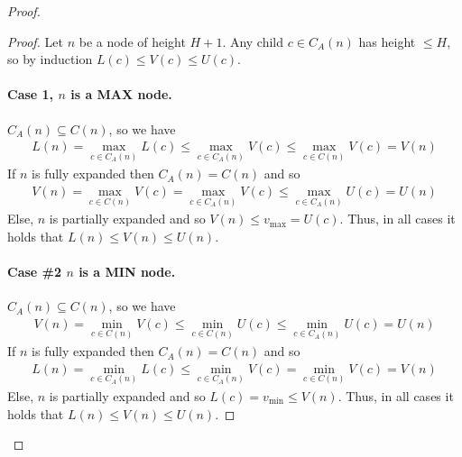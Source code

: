 \documentclass[letterpaper]{article} %
\newcommand{\MM}{\mathit{V}}
\newcommand{\pess}{\mathit{L}}
\newcommand{\opti}{\mathit{U}}
\newcommand{\vmax}{v_{\text{max}}}
\newcommand{\vmin}{v_{\text{min}}}
\begin{document}
\begin{proof}
\begin{proof}
Let $n$ be a node of height $H+1$.
Any child $c \in C_A(n)$ has height $\leq H$, so by induction $\pess(c)\leq \MM(c)\leq \opti(c)$.

\paragraph{Case 1, $n$ is a MAX node.}
$C_A(n) \subseteq C(n)$, so we have
\begin{align}
\!\! \pess(n) = \!\!\!\!\max_{c\in C_A(n)} \!\!\!\!\pess(c) \leq \!\!\!\!\max_{c\in C_A(n)} \!\!\!\!\MM(c) \leq \!\!\!\!\max_{c\in C(n)} \!\!\!\! \MM(c) \! = \!\!\MM(n)
\end{align}
If $n$ is fully expanded then $C_A(n)=C(n)$ and so
\begin{align}
 \!\!\MM(n) \!= \!\!\!\!\max_{c \in C(n)} \!\!\!\!\MM(c) \!= \!\!\!\!\max_{c \in C_A(n)} \!\!\!\!\MM(c) \leq \!\!\!\!\max_{c \in C_A(n)} \!\!\!\!\opti(c) \!= \!\!\opti(n)
\end{align}
Else, $n$ is partially expanded and so $\MM(n) \leq \vmax = \opti(c)$.
Thus, in all cases it holds that $\pess(n) \leq \MM(n) \leq \opti(n)$.


\paragraph{Case \#2 $n$ is a MIN node.}
$C_A(n) \subseteq C(n)$, so we have
\begin{align}
  \!\!\!\!\MM(n) \!= \!\!\!\!\min_{c\in C(n)} \!\!\!\!\MM(c) \leq \!\!\!\!\min_{c\in C(n)} \!\!\!\!\opti(c) \leq \!\!\!\!\min_{c \in C_A(n)} \!\!\!\! \opti(c) \! = \! \opti(n)
\end{align}
If $n$ is fully expanded then $C_A(n)=C(n)$ and so
\begin{align}
 \!\!\pess(n) \!\! = \!\!\!\!\min_{c \in C_A(n)} \!\!\!\!\pess(c) \leq \!\!\!\!\min_{c \in C_A(n)} \!\!\!\!\MM(c) = \!\!\!\!\min_{c \in C(n)} \!\!\!\!\MM(c) \!=\! \MM(n)
\end{align}
Else, $n$ is partially expanded and so $\pess(c) = \vmin\leq \MM(n)$. 
Thus, in all cases it holds that $\pess(n) \leq \MM(n) \leq \opti(n)$.



\end{proof}
\end{proof}
\end{document}
